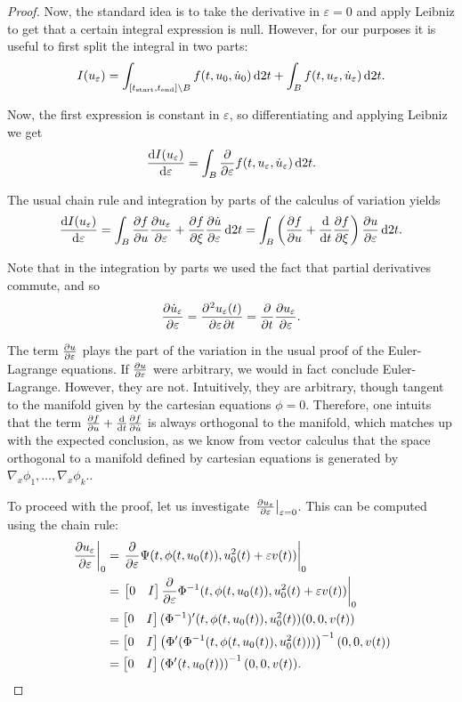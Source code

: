 \documentclass{article}
\theoremstyle{plain}
\theoremstyle{nonumberplain}
\newtheorem{proof}{Proof}
\newcommand{\tstart}{\mathrm{start}}
\newcommand{\tend}{\mathrm{end}}
\DeclarePairedDelimiter\eval{.}{\rvert}
\begin{document}
\begin{proof}
Now, the standard idea is to take the derivative in $\varepsilon = 0$ and apply Leibniz to get that a certain integral expression is null. However, for our purposes it is useful to first split the integral in two parts:
\[I(u_\varepsilon) = \int_{[t_\tstart,t_\tend] \setminus B} f(t,u_0,\dot u_0) \dl2 t + \int_B f(t,u_\varepsilon, \dot u_\varepsilon) \dl2 t.\]

Now, the first expression is constant in $\varepsilon$, so differentiating and applying Leibniz we get
\[\diff{I(u_\varepsilon)}\varepsilon = \int_B \diffp*{f(t,u_\varepsilon, \dot u_\varepsilon)}\varepsilon \dl2 t.\]

The usual chain rule and integration by parts of the calculus of variation yields
\[
\diff{I(u_\varepsilon)}\varepsilon = \int_B \diffp f u \diffp{u_\varepsilon}\varepsilon + \diffp f {\xi} \diffp{\dot u}\varepsilon \dl2 t = \int_B \left( \diffp f u + \diff*{\diffp f {\xi}}t \right) \diffp{u}\varepsilon \dl2 t.
\]

Note that in the integration by parts we used the fact that partial derivatives commute, and so
\[\diffp{\dot u_\varepsilon}\varepsilon = \diffp{u_\varepsilon(t)}{\varepsilon,t} = \diffp*{\diffp {u_\varepsilon} \varepsilon}t.\]

The term $\diffp u \varepsilon$ plays the part of the variation in the usual proof of the Euler-Lagrange equations. If $\diffp u \varepsilon$ were arbitrary, we would in fact conclude Euler-Lagrange. However, they are not. Intuitively, they are arbitrary, though tangent to the manifold given by the cartesian equations $\phi = 0$. Therefore, one intuits that the term $\diffp f u + \diff*{\diffp f {\dot u}}t$ is always orthogonal to the manifold, which matches up with the expected conclusion, as we know from vector calculus that the space orthogonal to a manifold defined by cartesian equations is generated by $\nabla_x \phi_1, \dots, \nabla_x \phi_k$..

To proceed with the proof, let us investigate $\eval*{\diffp {u_\varepsilon} \varepsilon}_{\varepsilon = 0}$. This can be computed using the chain rule:
\begin{align*}
\eval*{\diffp {u_\varepsilon} \varepsilon}_0 &= \eval*{\diffp*{\Psi(t, \phi(t,u_0(t)), u_0^2(t) + \varepsilon v(t))} \varepsilon}_0\\
&= \eval*{\begin{bmatrix} 0 & I \end{bmatrix} \diffp*{\Phi^{-1}(t, \phi(t,u_0(t)), u_0^2(t) + \varepsilon v(t))} \varepsilon}_0\\
&= \begin{bmatrix} 0 & I \end{bmatrix} (\Phi^{-1})'(t, \phi(t,u_0(t)), u_0^2(t)) (0, 0, v(t))\\
&= \begin{bmatrix} 0 & I \end{bmatrix} \left(\Phi'(\Phi^{-1}(t, \phi(t,u_0(t)), u_0^2(t)))\right)^{-1} (0,0,v(t))\\
&= \begin{bmatrix} 0 & I \end{bmatrix} \left( \Phi'(t, u_0(t)) \right)^{-1} (0,0,v(t)).
\end{align*}


\end{proof}
\end{document}
